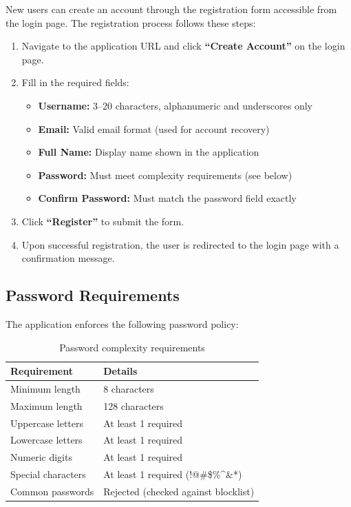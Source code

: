 New users can create an account through the registration form accessible from the login page. The registration process follows these steps:

\begin{enumerate}
    \item Navigate to the application URL and click \textbf{``Create Account''} on the login page.
    \item Fill in the required fields:
    \begin{itemize}
        \item \textbf{Username:} 3--20 characters, alphanumeric and underscores only
        \item \textbf{Email:} Valid email format (used for account recovery)
        \item \textbf{Full Name:} Display name shown in the application
        \item \textbf{Password:} Must meet complexity requirements (see below)
        \item \textbf{Confirm Password:} Must match the password field exactly
    \end{itemize}
    \item Click \textbf{``Register''} to submit the form.
    \item Upon successful registration, the user is redirected to the login page with a confirmation message.
\end{enumerate}

\subsection{Password Requirements}

The application enforces the following password policy:

\begin{table}[htbp]
\centering
\caption{Password complexity requirements}
\label{tab:password-policy}
\begin{tabular}{|l|l|}
\hline
\textbf{Requirement} & \textbf{Details} \\
\hline
Minimum length & 8 characters \\
\hline
Maximum length & 128 characters \\
\hline
Uppercase letters & At least 1 required \\
\hline
Lowercase letters & At least 1 required \\
\hline
Numeric digits & At least 1 required \\
\hline
Special characters & At least 1 required (!@\#\$\%\^{}\&*) \\
\hline
Common passwords & Rejected (checked against blocklist) \\
\hline
\end{tabular}
\end{table}

